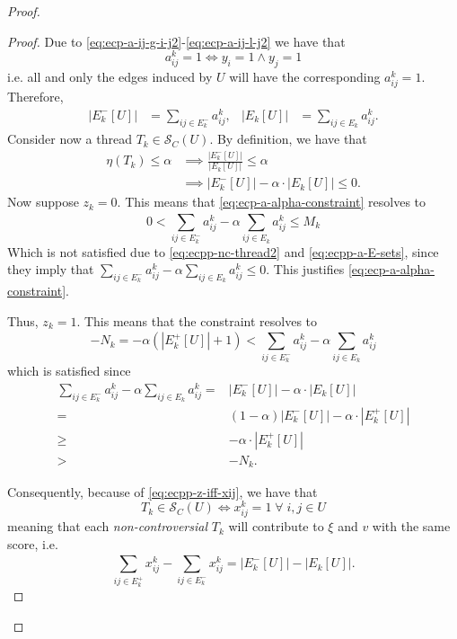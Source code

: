 \begin{proof}
\begin{proof}
		Due to \eqref{eq:ecp-a-ij-g-i-j2}-\eqref{eq:ecp-a-ij-l-j2} we
		have that
		\begin{equation}
			a_{ij}^{k} = 1 \iff y_i = 1 \land y_j = 1
		\end{equation}
		i.e. all and only the edges induced by $U$ will have the corresponding
		$a_{ij}^{k} = 1$. Therefore,
		\begin{align}
			\label{eq:ecpp-a-E-sets}
			|E^{-}_{k}[U]| & = \sum^{}_{ij \in E^-_k} a_{ij}^{k}, &
			|E_{k}[U]|     & = \sum^{}_{ij \in E_k } a_{ij}^{k}.
		\end{align}
		Consider now a thread $T_k \in \mathcal{S}_C(U)$. By definition, we
		have that
		\begin{align}
			\eta(T_k) \leq \alpha & \implies \frac{|E^{-}_{k}[U]|}{|E_{k}[U]|} \leq \alpha \\
			\label{eq:ecpp-nc-thread2}
			                      & \implies |E^{-}_{k}[U]| - \alpha \cdot
			|E_{k}[U]| \leq 0.
		\end{align}
		Now suppose $z_k = 0$. This means that
		\eqref{eq:ecp-a-alpha-constraint} resolves to
		\begin{equation*}
			0 < \sum^{}_{ij \in E^-_k} a_{ij}^{k}  - \alpha \sum^{}_{ij
				\in E_k}
			a_{ij} ^{k} \leq M_{k}
		\end{equation*}
		Which is not satisfied due to \eqref{eq:ecpp-nc-thread2} and
		\eqref{eq:ecpp-a-E-sets}, since they imply that $\sum^{}_{ij \in E^-_k} a_{ij}^{k}  - \alpha \sum^{}_{ij
				\in E_k}
			a_{ij} ^{k} \leq 0$. This justifies
		\eqref{eq:ecp-a-alpha-constraint}.

		Thus, $z_k = 1$. This
		means that the constraint resolves to
		\begin{equation*}
			-N_k = -\alpha (|E^{+}_{k}[U]| + 1)< \sum^{}_{ij \in E^-_k} a_{ij}^{k}  -
			\alpha \sum^{}_{ij \in E_k} a_{ij} ^{k}
		\end{equation*}
		which is satisfied since
		\begin{align}
			\sum^{}_{ij \in E^-_k} a_{ij}^{k}  - \alpha \sum^{}_{ij \in E_k}
			a_{ij} ^{k} = & |E^{-}_{k}[U]| - \alpha \cdot |E_{k}[U]|                \\
			=             & (1- \alpha)|E^{-}_{k}[U]| - \alpha \cdot |E^{+}_{k}[U]| \\
			\geq          & - \alpha \cdot |E^{+}_{k}[U]|                           \\
			>             & - N_k.
		\end{align}

		Consequently, because of \eqref{eq:ecpp-z-iff-xij}, we have that
		\begin{equation}
			T_k \in \mathcal{S}_C(U) \iff x_{ij}^{k} = 1 \; \forall \;i, j \in U
		\end{equation}
		meaning that each \emph{non-controversial} $T_k$ will contribute to
		$\xi$ and $v$ with the same score, i.e.
		\begin{equation*}
			\sum^{}_{ij \in E^{+}_k } x_{ij}
				^{k} - \sum_{ij \in E^{-} _k} x_{ij} ^{k} = |E^{-}_{k}[U]| -
			|E_{k}[U]|.
		\end{equation*}


\end{proof}
\end{proof}
